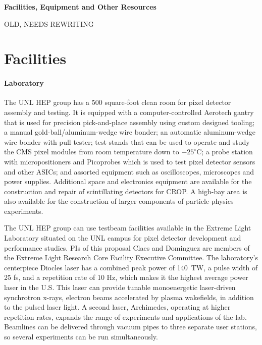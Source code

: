 \documentclass[11pt]{article}
\begin{document}
\begin{center}
{\large \bf Facilities, Equipment and Other Resources}\\
\end{center}

{\Huge\color{red} OLD, NEEDS REWRITING}

\section{Facilities}

\paragraph{Laboratory} The UNL HEP group has a 500 square-foot clean room for pixel detector assembly and testing.  It is equipped with a computer-controlled Aerotech gantry that is used for precision pick-and-place assembly using custom designed tooling; a manual gold-ball/aluminum-wedge wire bonder; an automatic aluminum-wedge wire bonder with pull tester; test stands that can be used to operate and study the CMS pixel modules from room temperature down to $-25^{\circ}$C; a probe station with micropositioners and Picoprobes which is used to test pixel detector sensors and other ASICs; and assorted equipment such as oscilloscopes, microscopes and power supplies.  Additional space and electronics equipment are available for the construction and repair of scintillating detectors for CROP. A high-bay
area is also available for the construction of larger components of
particle-physics experiments.

The UNL HEP group can use testbeam facilities available in the Extreme Light Laboratory situated on the UNL campus for pixel detector development and performance studies. PIs 
of this proposal Claes and Dominguez are members of the Extreme Light Research Core Facility Executive Committee. The laboratory's centerpiece Diocles laser has a combined peak power of 140~TW, a pulse width of 25 fs, and a repetition rate of 10 Hz, which makes it the highest average power laser in the U.S. This laser can provide tunable monoenergetic laser-driven synchrotron x-rays, electron beams accelerated by plasma wakefields, in addition to the pulsed laser light. A second laser, Archimedes, operating at higher repetition rates, expands the range of experiments and applications of the lab. Beamlines can be delivered through vacuum pipes to three separate user stations, so several experiments can be run simultaneously.
\end{document}
